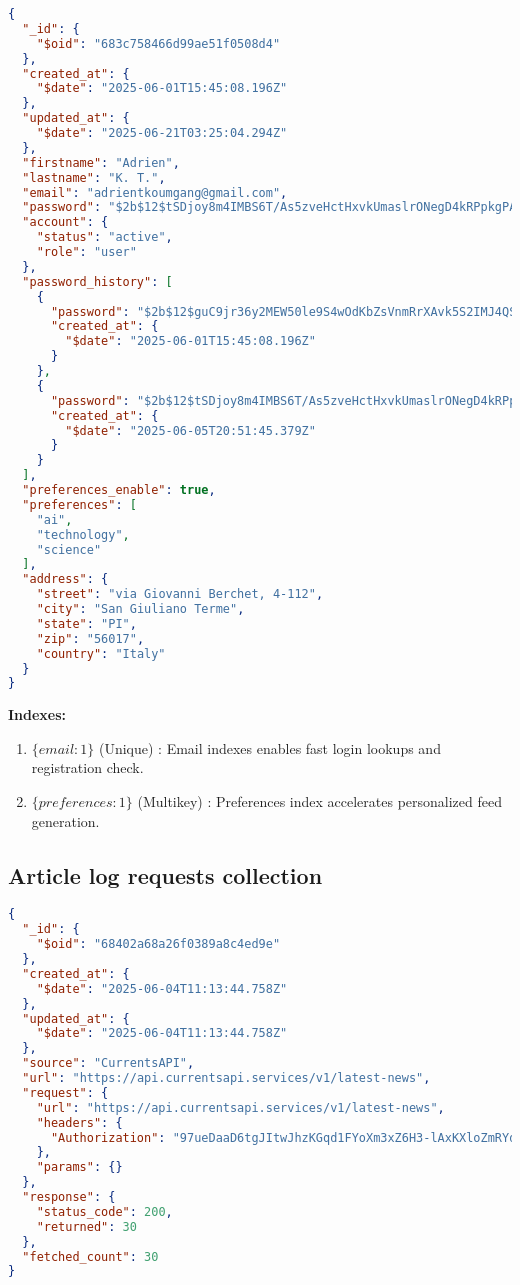 \begin{lstlisting}[language=json,label={lst:users-collection-json-example}]
{
  "_id": {
    "$oid": "683c758466d99ae51f0508d4"
  },
  "created_at": {
    "$date": "2025-06-01T15:45:08.196Z"
  },
  "updated_at": {
    "$date": "2025-06-21T03:25:04.294Z"
  },
  "firstname": "Adrien",
  "lastname": "K. T.",
  "email": "adrientkoumgang@gmail.com",
  "password": "$2b$12$tSDjoy8m4IMBS6T/As5zveHctHxvkUmaslrONegD4kRPpkgPARlJK",
  "account": {
    "status": "active",
    "role": "user"
  },
  "password_history": [
    {
      "password": "$2b$12$guC9jr36y2MEW50le9S4wOdKbZsVnmRrXAvk5S2IMJ4QSkJSTaG5e",
      "created_at": {
        "$date": "2025-06-01T15:45:08.196Z"
      }
    },
    {
      "password": "$2b$12$tSDjoy8m4IMBS6T/As5zveHctHxvkUmaslrONegD4kRPpkgPARlJK",
      "created_at": {
        "$date": "2025-06-05T20:51:45.379Z"
      }
    }
  ],
  "preferences_enable": true,
  "preferences": [
    "ai",
    "technology",
    "science"
  ],
  "address": {
    "street": "via Giovanni Berchet, 4-112",
    "city": "San Giuliano Terme",
    "state": "PI",
    "zip": "56017",
    "country": "Italy"
  }
}
\end{lstlisting}

\textbf{Indexes:}

\begin{enumerate}
  \item $\{ email: 1 \}$ (Unique) : Email indexes enables fast login lookups and registration check.
  \item $\{ preferences: 1 \}$ (Multikey) : Preferences index accelerates personalized feed generation.
\end{enumerate}


\subsection{Article log requests collection}\label{subsec:article-log-requests-collection}

\begin{lstlisting}[language=json,label={lst:article-log-requests-collection-json-example}]
{
  "_id": {
    "$oid": "68402a68a26f0389a8c4ed9e"
  },
  "created_at": {
    "$date": "2025-06-04T11:13:44.758Z"
  },
  "updated_at": {
    "$date": "2025-06-04T11:13:44.758Z"
  },
  "source": "CurrentsAPI",
  "url": "https://api.currentsapi.services/v1/latest-news",
  "request": {
    "url": "https://api.currentsapi.services/v1/latest-news",
    "headers": {
      "Authorization": "97ueDaaD6tgJItwJhzKGqd1FYoXm3xZ6H3-lAxKXloZmRYdm"
    },
    "params": {}
  },
  "response": {
    "status_code": 200,
    "returned": 30
  },
  "fetched_count": 30
}
\end{lstlisting}

